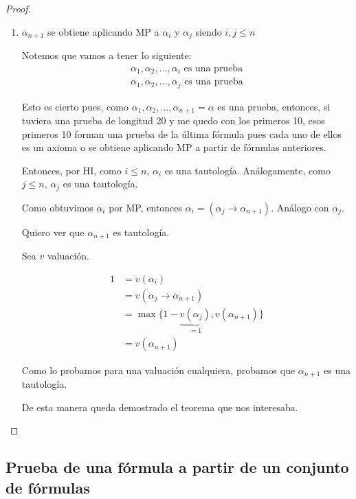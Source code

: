 \begin{proof}
\begin{enumerate}
        \item $\alpha_{n+1}$ se obtiene aplicando MP a $\alpha_i$ y $\alpha_j$
            siendo $i, j \leq n$

            Notemos que vamos a tener lo siguiente:
            \begin{gather*}
                \alpha_1, \alpha_2, \dotsc, \alpha_i \text{ es una prueba}\\
                \alpha_1, \alpha_2, \dotsc, \alpha_j \text{ es una prueba}
            \end{gather*}

            Esto es cierto pues, como 
            $\alpha_1, \alpha_2, \dotsc, \alpha_{n+1}=\alpha$ es una
            prueba, entonces, si tuviera una prueba de longitud 20 y me
            quedo con los primeros 10, esos primeros 10 forman una prueba de
            la última fórmula pues cada uno de ellos es un axioma o se obtiene
            aplicando MP a partir de fórmulas anteriores.

            Entonces, por HI, como $i \leq n$, $\alpha_i$ es una tautología.
            Análogamente, como $j \leq n$, $\alpha_j$ es una tautología.

            Como obtuvimos $\alpha_i$ por MP, entonces 
            $\alpha_i = (\alpha_j \to \alpha_{n+1})$.
            Análogo con $\alpha_j$.

            Quiero ver que $\alpha_{n+1}$ es tautología.

            Sea $v$ valuación.

            \begin{align*}
                1 &= v(\alpha_i) \\
                  &= v(\alpha_j \to \alpha_{n+1}) \\
                  &= \max \{ 1- \underbrace{v(\alpha_j)}_{=1}, 
                  v(\alpha_{n+1}) \} \\
                  &= v(\alpha_{n+1})
            \end{align*}

            Como lo probamos para una valuación cualquiera, probamos que
            $\alpha_{n+1}$ es una tautología.

            De esta manera queda demostrado el teorema que nos interesaba.
    \end{enumerate}
\end{proof}


\subsection{Prueba de una fórmula a partir de un conjunto de fórmulas}
 
